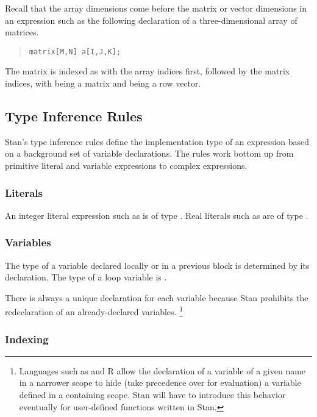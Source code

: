 Recall that the array dimensions come before the matrix or vector
dimensions in an expression such as the following declaration of a
three-dimensional array of matrices.
%
\begin{quote}
\begin{Verbatim}[fontsize=\small]
matrix[M,N] a[I,J,K];
\end{Verbatim}
\end{quote}
%
The matrix  is indexed as  with the array
indices first, followed by the matrix indices, with 
being a matrix and  being a row vector.

\subsection{Type Inference Rules}

Stan's type inference rules define the implementation type of an
expression based on a background set of variable declarations.  The
rules work bottom up from primitive literal and variable expressions
to complex expressions.

\subsubsection{Literals}

An integer literal expression such as  is of type .
Real literals such as  are of type .

\subsubsection{Variables}

The type of a variable declared locally or in a previous block is
determined by its declaration.  The type of a loop variable is
.  

There is always a unique declaration for each variable because Stan
prohibits the redeclaration of an already-declared variables.%
%
\footnote{Languages such as \Cpp and R allow the declaration of a
  variable of a given name in a narrower scope to hide (take
  precedence over for evaluation) a variable defined in a containing
  scope.  Stan will have to introduce this behavior eventually for
  user-defined functions written in Stan.}

\subsubsection{Indexing}

